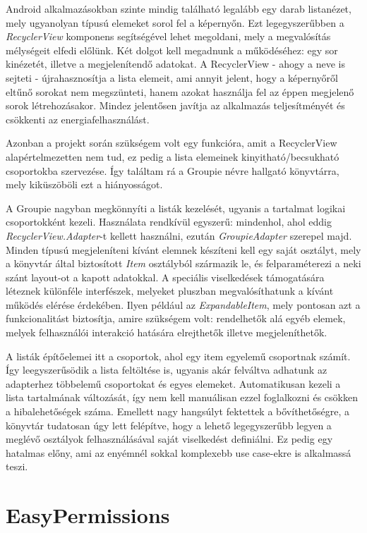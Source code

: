 Android alkalmazásokban szinte mindig található legalább egy darab listanézet, mely ugyanolyan típusú elemeket sorol fel a képernyőn. Ezt legegyszerűbben a \emph{RecyclerView} komponens segítségével lehet megoldani, mely a megvalósítás mélységeit elfedi előlünk. Két dolgot kell megadnunk a működéséhez: egy sor kinézetét, illetve a megjelenítendő adatokat. A RecyclerView - ahogy a neve is sejteti - újrahasznosítja a lista elemeit, ami annyit jelent, hogy a képernyőről eltűnő sorokat nem megszünteti, hanem azokat használja fel az éppen megjelenő sorok létrehozásakor. Mindez jelentősen javítja az alkalmazás teljesítményét és csökkenti az energiafelhasználást. \cite{RecyclerView}

Azonban a projekt során szükségem volt egy funkcióra, amit a RecyclerView alapértelmezetten nem tud, ez pedig a lista elemeinek kinyitható/becsukható csoportokba szervezése. Így találtam rá a Groupie névre hallgató könyvtárra, mely kiküszöböli ezt a hiányosságot. 

A Groupie nagyban megkönnyíti a listák kezelését, ugyanis a tartalmat logikai csoportokként kezeli. \cite{Groupie} Használata rendkívül egyszerű: mindenhol, ahol eddig \emph{RecyclerView.Adapter}-t kellett használni, ezután \emph{GroupieAdapter} szerepel majd. Minden típusú megjeleníteni kívánt elemnek készíteni kell egy saját osztályt, mely a könyvtár által biztosított \emph{Item} osztályból származik le, és felparaméterezi a neki szánt layout-ot a kapott adatokkal. A speciális viselkedések támogatására léteznek különféle interfészek, melyeket pluszban megvalósíthatunk a kívánt működés elérése érdekében. Ilyen például az \emph{ExpandableItem}, mely pontosan azt a funkcionalitást biztosítja, amire szükségem volt: rendelhetők alá egyéb elemek, melyek felhasználói interakció hatására elrejthetők illetve megjeleníthetők. 

A listák építőelemei itt a csoportok, ahol egy item egyelemű csoportnak számít. Így leegyszerűsödik a lista feltöltése is, ugyanis akár felváltva adhatunk az adapterhez többelemű csoportokat és egyes elemeket. Automatikusan kezeli a lista tartalmának változását, így nem kell manuálisan ezzel foglalkozni és csökken a hibalehetőségek száma. Emellett nagy hangsúlyt fektettek a bővíthetőségre, a könyvtár tudatosan úgy lett felépítve, hogy a lehető legegyszerűbb legyen a meglévő osztályok felhasználásával saját viselkedést definiálni. Ez pedig egy hatalmas előny, ami az enyémnél sokkal komplexebb use case-ekre is alkalmassá teszi. 

\section{EasyPermissions}

